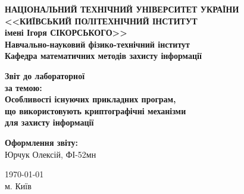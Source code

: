 \thispagestyle{empty}
\linespread{1.1}

\begin{center}
    {\bfseries\large
        НАЦІОНАЛЬНИЙ ТЕХНІЧНИЙ УНІВЕРСИТЕТ УКРАЇНИ \\
        <<КИЇВСЬКИЙ ПОЛІТЕХНІЧНИЙ ІНСТИТУТ \\
        імені Ігоря СІКОРСЬКОГО>> \\
        Навчально-науковий фізико-технічний інститут \\
        \medskip
        Кафедра математичних методів захисту інформації}
\end{center}

\begin{center}
\vspace{40mm}
{\bfseries\huge Звіт до лабораторної } \\
{\bfseries\Large за темою:} \\
{\bfseries\Large Особливості існуючих прикладних програм,} \\ 
{\bfseries\Large що використовують криптографічні механізми} \\
{\bfseries\Large для захисту інформації} \\
\end{center}

\vspace{55mm}
\begin{center}
    \hfill
    \begin{minipage}[t]{0.4\textwidth}
        \begin{flushright}
            \textbf{Оформлення звіту:} \\ 
                Юрчук Олексій, ФІ-52мн \\
        \end{flushright}
    \end{minipage}
\end{center}

\vfill
\begin{center}
    \today \\
    {м. Київ}
\end{center}

\newpage
{}
